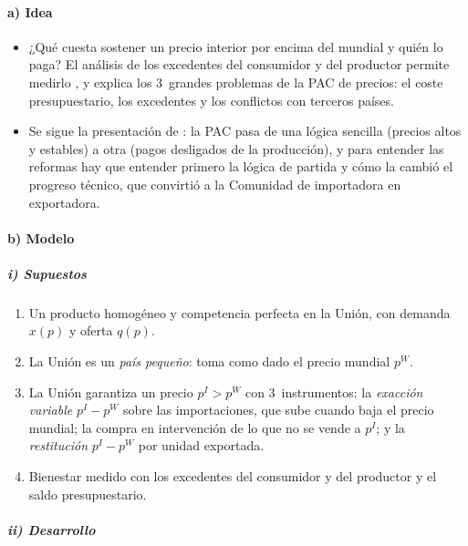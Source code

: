 \documentclass[11pt]{article}
\begin{document}
\paragraph{a) Idea}

\begin{itemize}
\item ¿Qué cuesta sostener un precio interior por encima del mundial y quién lo paga? El análisis de los excedentes del consumidor y del productor permite medirlo , y explica los 3~grandes problemas de la PAC de precios: el coste presupuestario, los excedentes y los conflictos con terceros países.
\item Se sigue la presentación de \textcite{BaldwinWyplosz2020Economics}: la PAC pasa de una lógica sencilla (precios altos y estables) a otra (pagos desligados de la producción), y para entender las reformas hay que entender primero la lógica de partida y cómo la cambió el progreso técnico, que convirtió a la Comunidad de importadora en exportadora.
\end{itemize}

\paragraph{b) Modelo}

\subparagraph{i) Supuestos}

\begin{enumerate}
\item Un producto homogéneo y competencia perfecta en la Unión, con demanda $x(p)$ y oferta $q(p)$.
\item La Unión es un \emph{país pequeño}: toma como dado el precio mundial $p^W$.
\item La Unión garantiza un precio $p^I>p^W$ con 3~instrumentos: la \emph{exacción variable} $p^I-p^W$ sobre las importaciones, que sube cuando baja el precio mundial; la compra en intervención de lo que no se vende a $p^I$; y la \emph{restitución} $p^I-p^W$ por unidad exportada.
\item Bienestar medido con los excedentes del consumidor y del productor y el saldo presupuestario.
\end{enumerate}

\subparagraph{ii) Desarrollo}
\end{document}
